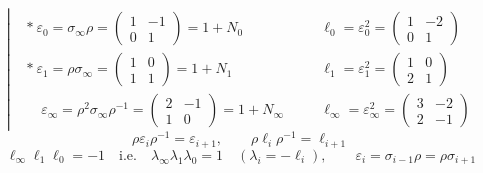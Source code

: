 \documentclass[11pt,a4paper]{article}
\begin{document}
\[
\left|
\begin{aligned}
&{*}\ \varepsilon_0 = \sigma_\infty\rho = \begin{pmatrix} 1 & -1 \\ 0 & 1 \end{pmatrix} = 1 + N_0 &\quad& \ell_0 = \varepsilon_0^2 = \begin{pmatrix} 1 & -2 \\ 0 & 1 \end{pmatrix} \\
&{*}\ \varepsilon_1 = \rho\sigma_\infty = \begin{pmatrix} 1 & 0 \\ 1 & 1 \end{pmatrix} = 1 + N_1 && \ell_1 = \varepsilon_1^2 = \begin{pmatrix} 1 & 0 \\ 2 & 1 \end{pmatrix} \\
&\phantom{*}\ \varepsilon_\infty = \rho^2\sigma_\infty\rho^{-1} = \begin{pmatrix} 2 & -1 \\ 1 & 0 \end{pmatrix} = 1 + N_\infty && \ell_\infty = \varepsilon_\infty^2 = \begin{pmatrix} 3 & -2 \\ 2 & -1 \end{pmatrix}
\end{aligned}
\right.
\]
\[
\rho\varepsilon_i\rho^{-1} = \varepsilon_{i+1}, \qquad \rho\ell_i\rho^{-1} = \ell_{i+1}
\]
\[
\ell_\infty\ell_1\ell_0 = -1 \quad \text{i.e.} \quad \lambda_\infty\lambda_1\lambda_0 = 1 \quad (\lambda_i = -\ell_i), \qquad
\varepsilon_i = \sigma_{i-1}\rho = \rho\sigma_{i+1}
\]
\end{document}
